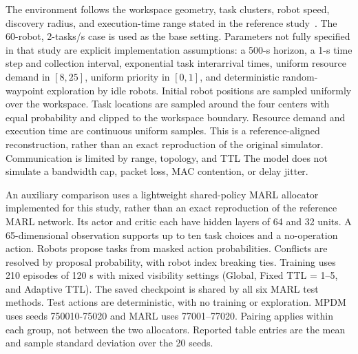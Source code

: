 \documentclass[type=submission,name=IR]{oae}
\begin{document}
The environment follows the workspace geometry, task clusters, robot speed, discovery radius, and execution-time range stated in the reference study~\cite{nayak2025limited}. The 60-robot, 2-tasks/s case is used as the base setting. Parameters not fully specified in that study are explicit implementation assumptions: a 500-s horizon, a 1-s time step and collection interval, exponential task interarrival times, uniform resource demand in $[8,25]$, uniform priority in $[0,1]$, and deterministic random-waypoint exploration by idle robots. Initial robot positions are sampled uniformly over the workspace. Task locations are sampled around the four centers with equal probability and clipped to the workspace boundary. Resource demand and execution time are continuous uniform samples. This is a reference-aligned reconstruction, rather than an exact reproduction of the original simulator. Communication is limited by range, topology, and TTL The model does not simulate a bandwidth cap, packet loss, MAC contention, or delay jitter.

An auxiliary comparison uses a lightweight shared-policy MARL allocator implemented for this study, rather than an exact reproduction of the reference MARL network. Its actor and critic each have hidden layers of 64 and 32 units. A 65-dimensional observation supports up to ten task choices and a no-operation action. Robots propose tasks from masked action probabilities. Conflicts are resolved by proposal probability, with robot index breaking ties. Training uses 210 episodes of 120 s with mixed visibility settings (Global, Fixed TTL = 1--5, and Adaptive TTL). The saved checkpoint is shared by all six MARL test methods. Test actions are deterministic, with no training or exploration. MPDM uses seeds 750010-75020 and MARL uses 77001--77020. Pairing applies within each group, not between the two allocators. Reported table entries are the mean and sample standard deviation over the 20 seeds.
\end{document}
